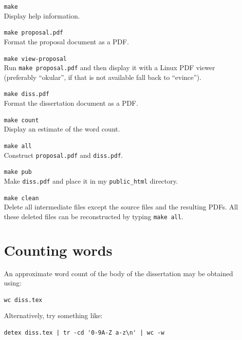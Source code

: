 \documentclass[12pt,a4paper,twoside,openright]{report}
\begin{document}
	\begin{description}
	
	\item\texttt{make} \\
	 Display help information.
	
	\item\texttt{make proposal.pdf} \\
	 Format the proposal document as a PDF.
	
	\item\texttt{make view-proposal} \\
	 Run \texttt{make proposal.pdf} and then display it with a Linux PDF viewer
	 (preferably ``okular'', if that is not available fall back to ``evince'').
	
	\item\texttt{make diss.pdf} \\
	 Format the dissertation document as a PDF.
	
	\item\texttt{make count} \\
	Display an estimate of the word count.
	
	\item\texttt{make all} \\
	Construct \texttt{proposal.pdf} and \texttt{diss.pdf}.
	
	\item\texttt{make pub} \\ Make \texttt{diss.pdf}
	and place it in my \texttt{public\_html} directory.
	
	\item\texttt{make clean} \\ Delete all intermediate files except the
	source files and the resulting PDFs. All these deleted files can
	be reconstructed by typing \texttt{make all}.
	
	\end{description}
	
	
	\section{Counting words}
	
	An approximate word count of the body of the dissertation may be
	obtained using:
	
	\texttt{wc diss.tex}
	
	\noindent
	Alternatively, try something like:
	
	\verb/detex diss.tex | tr -cd '0-9A-Z a-z\n' | wc -w/
	
\end{document}
